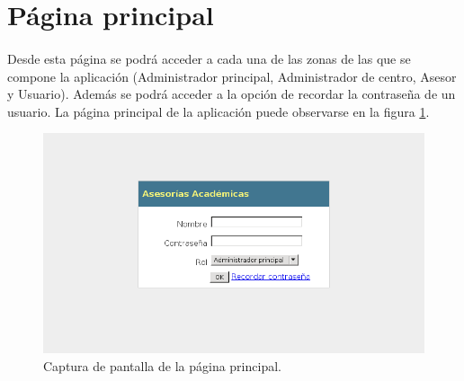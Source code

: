 \section{Página principal}

  \paragraph{}Desde esta página se podrá acceder a cada una de las zonas de las
  que se compone la aplicación (Administrador principal, Administrador de
  centro, Asesor y Usuario). Además se podrá acceder a la opción de recordar la
  contraseña de un usuario. La página principal de la aplicación puede
  observarse en la figura \ref{capturaPaginaPrincipal}.

  \begin{figure}[!ht]
    \begin{center}
      \includegraphics[scale=0.7]{13.Disenyo_Interfaz/13.2.Pagina_Principal/pagina_principal.png}
      \caption{Captura de pantalla de la página principal.}
      \label{capturaPaginaPrincipal}
    \end{center}
  \end{figure}
